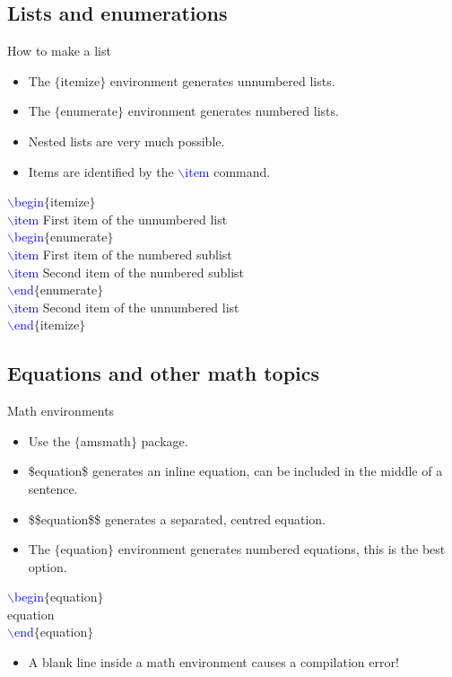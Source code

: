 \documentclass[usenames,dvipsnames,aspectratio=169]{beamer}
\newcommand{\aitem}{\item[$\cdot$]}
\begin{document}
\subsection{Lists and enumerations}
\begin{frame}[t]{How to make a list}
\begin{itemize}
\aitem The \textcolor{PineGreen}{$\{$itemize$\}$} environment generates unnumbered lists.
\aitem The \textcolor{PineGreen}{$\{$enumerate$\}$} environment generates numbered lists.
\aitem Nested lists are very much possible.
\aitem Items are identified by the \textcolor{blue}{$\backslash$item} command.
\end{itemize}
\textcolor{blue}{$\backslash$begin}\textcolor{PineGreen}{$\{$itemize$\}$}\\
\textcolor{blue}{$\backslash$item} First item of the unnumbered list\\
\textcolor{blue}{$\backslash$begin}\textcolor{PineGreen}{$\{$enumerate$\}$}\\
\textcolor{blue}{$\backslash$item} First item of the numbered sublist\\
\textcolor{blue}{$\backslash$item} Second item of the numbered sublist\\
\textcolor{blue}{$\backslash$end}\textcolor{PineGreen}{$\{$enumerate$\}$}\\
\textcolor{blue}{$\backslash$item} Second item of the unnumbered list\\
\textcolor{blue}{$\backslash$end}\textcolor{PineGreen}{$\{$itemize$\}$}
\end{frame}


\subsection{Equations and other math topics}
\begin{frame}[t]{Math environments}
\begin{itemize}
\aitem Use the \textcolor{PineGreen}{$\{$amsmath$\}$} package.
\aitem \textcolor{PineGreen}{\$equation\$} generates an inline equation, can be included in the middle of a sentence.
\aitem \textcolor{PineGreen}{\$\$equation\$\$} generates a separated, centred equation.
\aitem The \textcolor{PineGreen}{$\{$equation$\}$} environment generates numbered equations, this is the best option.
\end{itemize}
\textcolor{blue}{$\backslash$begin}\textcolor{PineGreen}{$\{$equation$\}$}\\
\textcolor{PineGreen}{equation}\\
\textcolor{blue}{$\backslash$end}\textcolor{PineGreen}{$\{$equation$\}$}
\begin{itemize}
\aitem A blank line inside a math environment causes a compilation error!
\end{itemize}
\end{frame}
\end{document}
